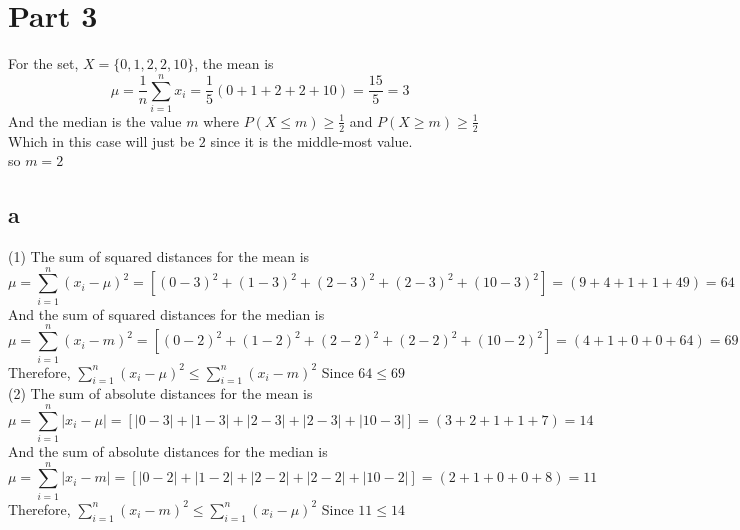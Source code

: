 \documentclass{article}
\begin{document}
\newpage

\section{Part 3}
For the set, $X=\{0,1,2,2,10\}$, the mean is
\begin{equation*}
  \mu=\frac{1}{n}\sum_{i=1}^{n}x_i
  =\frac{1}{5}(0+1+2+2+10)
  =\frac{15}{5}
  =3
\end{equation*}
And the median is the value $m$ where
$P(X\leq m)\geq\frac{1}{2}$ and $P(X\geq m)\geq\frac{1}{2}$
Which in this case will just be $2$ since it is the middle-most value. \\
so $m=2$

\subsection{a}
(1)
The sum of squared distances for the mean is
\begin{equation*}
  \mu=\sum_{i=1}^{n}(x_i-\mu)^2
  =[(0-3)^2+(1-3)^2+(2-3)^2+(2-3)^2+(10-3)^2]
  =(9+4+1+1+49)
  =64
\end{equation*}
And the sum of squared distances for the median is
\begin{equation*}
  \mu=\sum_{i=1}^{n}(x_i-m)^2
  =[(0-2)^2+(1-2)^2+(2-2)^2+(2-2)^2+(10-2)^2]
  =(4+1+0+0+64)
  =69
\end{equation*}
Therefore,
$\sum_{i=1}^{n}(x_i-\mu)^2 \le \sum_{i=1}^{n}(x_i-m)^2$
Since $64 \le 69$ \\

(2)
The sum of absolute distances for the mean is
\begin{equation*}
  \mu=\sum_{i=1}^{n}|x_i-\mu|
  =[|0-3|+|1-3|+|2-3|+|2-3|+|10-3|]
  =(3+2+1+1+7)
  =14
\end{equation*}
And the sum of absolute distances for the median is
\begin{equation*}
  \mu=\sum_{i=1}^{n}|x_i-m|
  =[|0-2|+|1-2|+|2-2|+|2-2|+|10-2|]
  =(2+1+0+0+8)
  =11
\end{equation*}
Therefore,
$\sum_{i=1}^{n}(x_i-m)^2 \le \sum_{i=1}^{n}(x_i-\mu)^2$
Since $11 \le 14$
\end{document}
